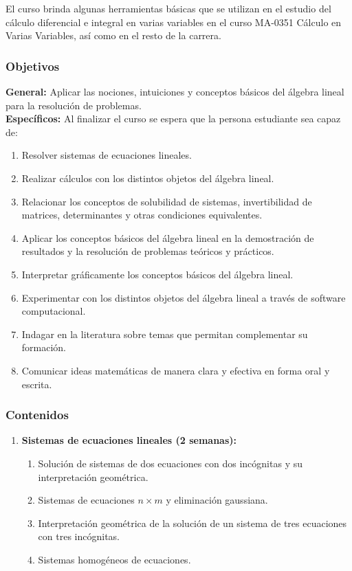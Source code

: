 \begin{refsection}
El curso brinda algunas herramientas básicas que se utilizan en el estudio del cálculo diferencial e integral en varias variables en el curso MA-0351 Cálculo en Varias Variables, así como en el resto de la carrera.

\subsubsection*{Objetivos}

\textbf{General:} Aplicar las nociones, intuiciones y conceptos básicos del álgebra lineal para la resolución de problemas. \\

\textbf{Específicos:} Al finalizar el curso se espera que la persona estudiante sea capaz de:

\begin{enumerate}
\item Resolver sistemas de ecuaciones lineales.
\item Realizar cálculos con los distintos objetos del álgebra lineal.
\item Relacionar los conceptos de solubilidad de sistemas, invertibilidad de matrices, determinantes y otras condiciones equivalentes.
\item Aplicar los conceptos básicos del álgebra lineal en la demostración de resultados y la resolución de problemas teóricos y prácticos.
\item Interpretar gráficamente los conceptos básicos del álgebra lineal.
\item Experimentar con los distintos objetos del álgebra lineal a través de software computacional.
\item Indagar en la literatura sobre temas que permitan complementar su formación.
\item Comunicar ideas matemáticas de manera clara y efectiva en forma oral y escrita.
\end{enumerate}

\subsubsection*{Contenidos}

\begin{enumerate}
\item \textbf{Sistemas de ecuaciones lineales (2 semanas):} 
\begin{enumerate}
    \item Solución de sistemas de dos ecuaciones con dos incógnitas y su interpretación geométrica.
    \item Sistemas de ecuaciones $n \times m$ y eliminación gaussiana.
    \item Interpretación geométrica de la solución de un sistema de tres ecuaciones con tres incógnitas.
    \item Sistemas homogéneos de ecuaciones.
\end{enumerate}


\end{enumerate}
\end{refsection}
